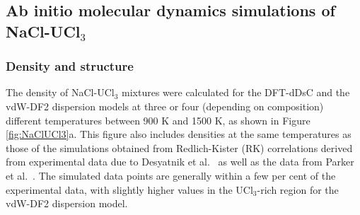\documentclass[preprint,3p,10pt,onecolumn,number,sort&compress]{elsarticle}
\begin{document}
{%




\FloatBarrier

\subsection{Ab initio molecular dynamics simulations of NaCl-UCl$_3$}
\subsubsection{Density and structure}
The density of NaCl-UCl$_3$ mixtures were calculated for the DFT-dDsC and the vdW-DF2 dispersion models at three or four (depending on composition) different temperatures between 900 K and 1500 K, as shown in Figure \ref{fig:NaClUCl3}a. This figure also includes densities at the same temperatures as those of the simulations obtained from Redlich-Kister (RK) correlations \cite{agca2022} derived from experimental data due to Desyatnik et al.~\cite{Desyatnik} as well as the data from Parker et al.~\cite{Parker}. The simulated data points are generally within a few per cent of the experimental data, with slightly higher values in the UCl$_3$-rich region for the vdW-DF2 dispersion model.

}
\end{document}

